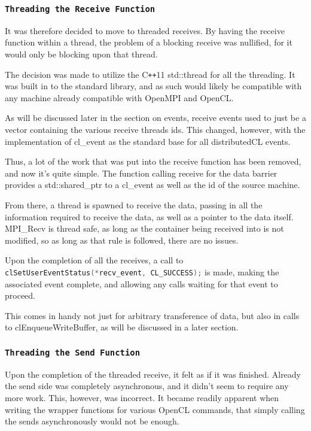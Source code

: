 \documentclass[thesis.tex]{subfiles}
\begin{document}

  \subsubsection{\texttt{Threading the Receive Function}} %
  \label{ssub:threading_the_receive_function}
      
    It was therefore decided to move to threaded receives. By having the receive function within a thread, the problem of a blocking receive was nullified, for it would only be blocking upon that thread.

    The decision was made to utilize the C\texttt{++}11 std::thread for all the threading. It was built in to the standard library, and as such would likely be compatible with any machine already compatible with OpenMPI and OpenCL.

    As will be discussed later in the section on events, receive events used to just be a vector containing the various receive threads ids. This changed, however, with the implementation of cl\_event as the standard base for all distributedCL events.

    Thus, a lot of the work that was put into the receive function has been removed, and now it's quite simple. The function calling receive for the data barrier provides a std::shared\_ptr to a cl\_event as well as the id of the source machine.

    From there, a thread is spawned to receive the data, passing in all the information required to receive the data, as well as a pointer to the data itself. MPI\_Recv is thread safe, as long as the container being received into is not modified, so as long as that rule is followed, there are no issues.

    Upon the completion of all the receives, a call to \lstinline[language=cpp]{clSetUserEventStatus(*recv_event, CL_SUCCESS);} is made, making the associated event complete, and allowing any calls waiting for that event to proceed.

    This comes in handy not just for arbitrary transference of data, but also in calls to clEnqueueWriteBuffer, as will be discussed in a later section.


  \subsubsection{\texttt{Threading the Send Function}} %
  \label{ssub:threading_the_send_function}
    Upon the completion of the threaded receive, it felt as if it was finished. Already the send side was completely asynchronous, and it didn't seem to require any more work. This, however, was incorrect. It became readily apparent when writing the wrapper functions for various OpenCL commands, that simply calling the sends asynchronously would not be enough.
\end{document}
